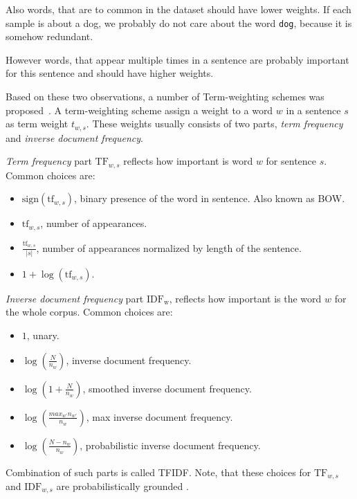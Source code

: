     Also words, that are to common in the dataset should have lower weights.
    If each sample is about a dog, we probably do not care about the word \texttt{dog}, because it is somehow redundant.
    
    However words, that appear multiple times in a sentence are probably important for this sentence and should have higher weights.
    
    Based on these two observations, a number of Term-weighting schemes was proposed~\cite{salton1988term}.
    A term-weighting scheme assign a weight to a word $w$ in a sentence $s$ as term weight $t_{w,s}$.
    These weights usually consists of two parts, \emph{term frequency} and \emph{inverse document frequency}. 
    
    \emph{Term frequency} part $\mathrm{TF}_{w,s}$ reflects how important is word $w$ for sentence $s$.
    Common choices are:
    \begin{itemize}
        \item $\mathrm{sign}(\mathrm{tf}_{w,s})$, binary presence of the word in sentence. Also known as BOW.
        \item $\mathrm{tf}_{w,s}$, number of appearances.
        \item $\frac{\mathrm{tf}_{w,s}}{|s|}$, number of appearances normalized by length of the sentence.
        \item $1+\log(\mathrm{tf}_{w,s})$.
    \end{itemize}
    
    \emph{Inverse document frequency} part $\mathrm{IDF_w}$, reflects how important is the word $w$ for the whole corpus.
    Common choices are:
    \begin{itemize}
        \item $1$, unary.
        \item $\log \left(\frac{N}{n_w} \right)$, inverse document frequency.
        \item $\log \left( 1+\frac{N}{n_w} \right)$, smoothed inverse document frequency.
        \item $\log \left( \frac{max_{w'} n_{w'}}{n_w} \right)$, max inverse document frequency.
        \item $\log \left(\frac{N-n_w}{n_w} \right)$, probabilistic inverse document frequency.
    \end{itemize}

    Combination of such parts is called TFIDF.
    Note, that these choices for $\mathrm{TF}_{w,s}$ and $\mathrm{IDF}_{w,s}$ are probabilistically grounded \cite{aizawa2003information}. %
    
